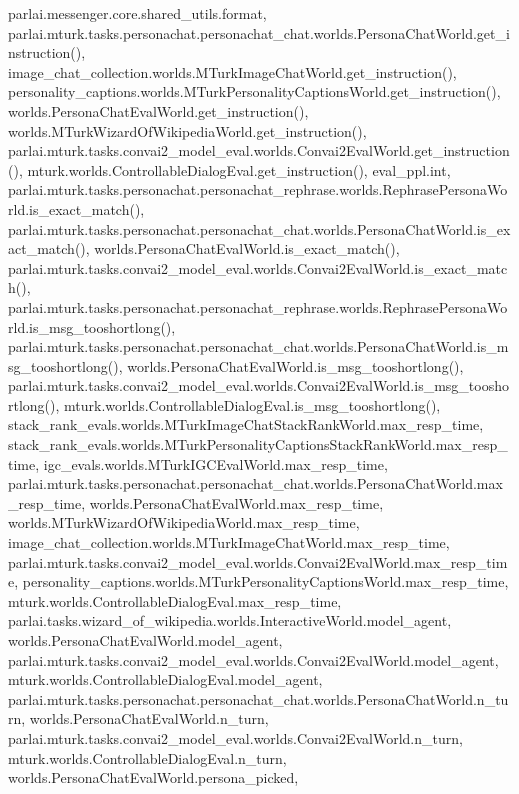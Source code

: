parlai.\+messenger.\+core.\+shared\+\_\+utils.\+format, parlai.\+mturk.\+tasks.\+personachat.\+personachat\+\_\+chat.\+worlds.\+Persona\+Chat\+World.\+get\+\_\+instruction(), image\+\_\+chat\+\_\+collection.\+worlds.\+M\+Turk\+Image\+Chat\+World.\+get\+\_\+instruction(), personality\+\_\+captions.\+worlds.\+M\+Turk\+Personality\+Captions\+World.\+get\+\_\+instruction(), worlds.\+Persona\+Chat\+Eval\+World.\+get\+\_\+instruction(), worlds.\+M\+Turk\+Wizard\+Of\+Wikipedia\+World.\+get\+\_\+instruction(), parlai.\+mturk.\+tasks.\+convai2\+\_\+model\+\_\+eval.\+worlds.\+Convai2\+Eval\+World.\+get\+\_\+instruction(), mturk.\+worlds.\+Controllable\+Dialog\+Eval.\+get\+\_\+instruction(), eval\+\_\+ppl.\+int, parlai.\+mturk.\+tasks.\+personachat.\+personachat\+\_\+rephrase.\+worlds.\+Rephrase\+Persona\+World.\+is\+\_\+exact\+\_\+match(), parlai.\+mturk.\+tasks.\+personachat.\+personachat\+\_\+chat.\+worlds.\+Persona\+Chat\+World.\+is\+\_\+exact\+\_\+match(), worlds.\+Persona\+Chat\+Eval\+World.\+is\+\_\+exact\+\_\+match(), parlai.\+mturk.\+tasks.\+convai2\+\_\+model\+\_\+eval.\+worlds.\+Convai2\+Eval\+World.\+is\+\_\+exact\+\_\+match(), parlai.\+mturk.\+tasks.\+personachat.\+personachat\+\_\+rephrase.\+worlds.\+Rephrase\+Persona\+World.\+is\+\_\+msg\+\_\+tooshortlong(), parlai.\+mturk.\+tasks.\+personachat.\+personachat\+\_\+chat.\+worlds.\+Persona\+Chat\+World.\+is\+\_\+msg\+\_\+tooshortlong(), worlds.\+Persona\+Chat\+Eval\+World.\+is\+\_\+msg\+\_\+tooshortlong(), parlai.\+mturk.\+tasks.\+convai2\+\_\+model\+\_\+eval.\+worlds.\+Convai2\+Eval\+World.\+is\+\_\+msg\+\_\+tooshortlong(), mturk.\+worlds.\+Controllable\+Dialog\+Eval.\+is\+\_\+msg\+\_\+tooshortlong(), stack\+\_\+rank\+\_\+evals.\+worlds.\+M\+Turk\+Image\+Chat\+Stack\+Rank\+World.\+max\+\_\+resp\+\_\+time, stack\+\_\+rank\+\_\+evals.\+worlds.\+M\+Turk\+Personality\+Captions\+Stack\+Rank\+World.\+max\+\_\+resp\+\_\+time, igc\+\_\+evals.\+worlds.\+M\+Turk\+I\+G\+C\+Eval\+World.\+max\+\_\+resp\+\_\+time, parlai.\+mturk.\+tasks.\+personachat.\+personachat\+\_\+chat.\+worlds.\+Persona\+Chat\+World.\+max\+\_\+resp\+\_\+time, worlds.\+Persona\+Chat\+Eval\+World.\+max\+\_\+resp\+\_\+time, worlds.\+M\+Turk\+Wizard\+Of\+Wikipedia\+World.\+max\+\_\+resp\+\_\+time, image\+\_\+chat\+\_\+collection.\+worlds.\+M\+Turk\+Image\+Chat\+World.\+max\+\_\+resp\+\_\+time, parlai.\+mturk.\+tasks.\+convai2\+\_\+model\+\_\+eval.\+worlds.\+Convai2\+Eval\+World.\+max\+\_\+resp\+\_\+time, personality\+\_\+captions.\+worlds.\+M\+Turk\+Personality\+Captions\+World.\+max\+\_\+resp\+\_\+time, mturk.\+worlds.\+Controllable\+Dialog\+Eval.\+max\+\_\+resp\+\_\+time, parlai.\+tasks.\+wizard\+\_\+of\+\_\+wikipedia.\+worlds.\+Interactive\+World.\+model\+\_\+agent, worlds.\+Persona\+Chat\+Eval\+World.\+model\+\_\+agent, parlai.\+mturk.\+tasks.\+convai2\+\_\+model\+\_\+eval.\+worlds.\+Convai2\+Eval\+World.\+model\+\_\+agent, mturk.\+worlds.\+Controllable\+Dialog\+Eval.\+model\+\_\+agent, parlai.\+mturk.\+tasks.\+personachat.\+personachat\+\_\+chat.\+worlds.\+Persona\+Chat\+World.\+n\+\_\+turn, worlds.\+Persona\+Chat\+Eval\+World.\+n\+\_\+turn, parlai.\+mturk.\+tasks.\+convai2\+\_\+model\+\_\+eval.\+worlds.\+Convai2\+Eval\+World.\+n\+\_\+turn, mturk.\+worlds.\+Controllable\+Dialog\+Eval.\+n\+\_\+turn, worlds.\+Persona\+Chat\+Eval\+World.\+persona\+\_\+picked, 